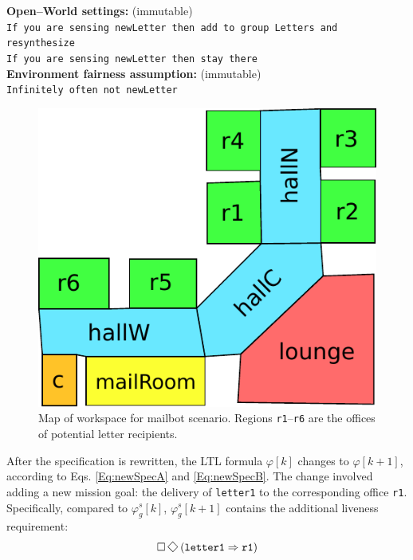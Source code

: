 \begin{algorithm}
{%
	
	
	\textbf{Open--World settings:} (immutable)\\
	\texttt{If you are sensing newLetter then add to group Letters and resynthesize}\\
	\texttt{If you are sensing newLetter then stay there}\\
		
	\textbf{Environment fairness assumption:} (immutable)\\
	\texttt{Infinitely often not newLetter}\\
	}
	\vspace{-10 pt}
\end{algorithm}

\begin{figure}[h]
	\centering
	\includegraphics[width=0.80\columnwidth, clip]{./img/mailbot_map.pdf}
	\caption{Map of workspace for mailbot scenario.  Regions \texttt{r1}--\texttt{r6} are the offices of potential letter recipients.} 
	\label{Fig:map}
\end{figure}

After the specification is rewritten, the LTL formula $\varphi [k]$ changes to $\varphi [k+1]$, according to Eqs. \eqref{Eq:newSpecA} and \eqref{Eq:newSpecB}. The change involved adding a new mission goal: the delivery of \texttt{letter1} to the corresponding office \texttt{r1}. Specifically, compared to $\varphi_g^s [k]$, $\varphi_g^s [k+1]$ contains the additional liveness requirement:
\begin{equation*}
	\G\F\left( \texttt{letter1} \Rightarrow \texttt{r1} \right)
\end{equation*}

